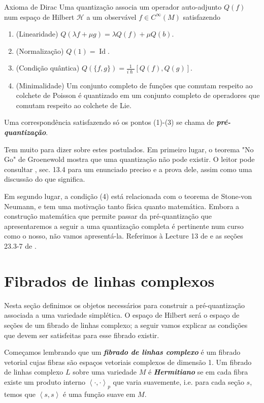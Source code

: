 \begin{thing5}{Axioma de Dirac}\leavevmode
Uma quantização associa um operador auto-adjunto $Q(f)$ num espaço de Hilbert $\mathcal{H}$ a um observável $f \in C^\infty(M)$ satisfazendo
\begin{enumerate}
\item (Linearidade) $Q(\lambda f + \mu g)=\lambda Q(f)+\mu Q(b)$.
\item (Normalização) $Q(1)=\operatorname{Id}$.
\item (Condição quântica) $Q(\{f,g\})=\frac{1}{i\hslash}[Q(f),Q(g)]$.
\item (Minimalidade) Um conjunto completo de funções que comutam respeito ao colchete de Poisson é quantizado em um conjunto completo de operadores que comutam respeito ao colchete de Lie.
\end{enumerate}
\end{thing5}
Uma correspondência satisfazendo só os pontos (1)-(3) se chama de \textit{\textbf{pré-quantização}}.

Tem muito para dizer sobre estes postulados. Em primeiro lugar, o teorema "No Go" de Groenewold mostra que uma quantização não pode existir. O leitor pode consultar  \cite{hallq}, sec. 13.4 para um enunciado preciso e a prova dele, assim como uma discussão do que significa.

Em segundo lugar, a condição (4) está relacionada com o teorema de Stone-von Neumann, e tem uma motivação tanto física quanto matemática. Embora a construção matemática que permite passar da pré-quantização que apresentaremos a seguir a uma quantização completa é pertinente num curso como o nosso, não vamos apresentá-la. Referimos à Lecture 13 de \cite{wang} e as seções 23.3-7 de \cite{hallq}.

\section{Fibrados de linhas complexos} 

Nesta seção definimos os objetos necessários para construir a pré-quantização associada a uma variedade simplética. O espaço de Hilbert será o espaço de seções de um fibrado de linhas complexo; a seguir vamos explicar as condições que devem ser satisfeitas para esse fibrado existir.

Começamos lembrando que um \textit{\textbf{fibrado de linhas complexo}} é um fibrado vetorial cujas fibras são espaços vetoriais complexos de dimensão 1. Um fibrado de linhas complexo $L$ sobre uma variedade $M$ é \textit{\textbf{Hermitiano}} se em cada fibra existe um produto interno $\left<\cdot,\cdot\right>_p$ que varia suavemente, i.e. para cada seção $s$, temos que $\left<s,s\right>$ é uma função suave em $M$.

